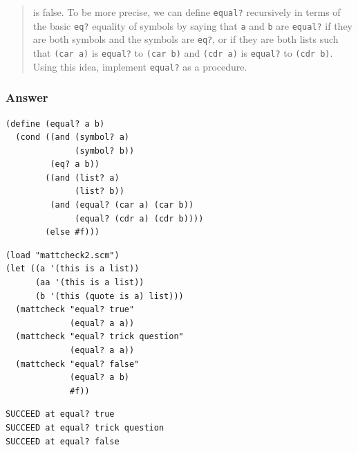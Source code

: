 \documentclass[final,fleqn,titlepage,twoside]{article}
\begin{document}
\begin{quote}
is false. To be more precise, we can define \texttt{equal?} recursively in
terms of the basic \texttt{eq?} equality of symbols by saying that
\texttt{a} and \texttt{b} are \texttt{equal?} if they are both symbols
and the symbols are \texttt{eq?}, or if they are both lists such that
\texttt{(car a)} is \texttt{equal?} to \texttt{(car b)} and
\texttt{(cdr a)} is \texttt{equal?} to \texttt{(cdr b)}. Using this
idea, implement \texttt{equal?} as a procedure.
\end{quote}

\subsubsection{Answer}
\label{sec:org87af4d7}
\begin{verbatim}
(define (equal? a b)
  (cond ((and (symbol? a)
              (symbol? b))
         (eq? a b))
        ((and (list? a)
              (list? b))
         (and (equal? (car a) (car b))
              (equal? (cdr a) (cdr b))))
        (else #f)))
\end{verbatim}

\begin{verbatim}
(load "mattcheck2.scm")
(let ((a '(this is a list))
      (aa '(this is a list))
      (b '(this (quote is a) list)))
  (mattcheck "equal? true"
             (equal? a a))
  (mattcheck "equal? trick question"
             (equal? a a))
  (mattcheck "equal? false"
             (equal? a b)
             #f))
\end{verbatim}

\begin{verbatim}
SUCCEED at equal? true
SUCCEED at equal? trick question
SUCCEED at equal? false
\end{verbatim}
\end{document}
